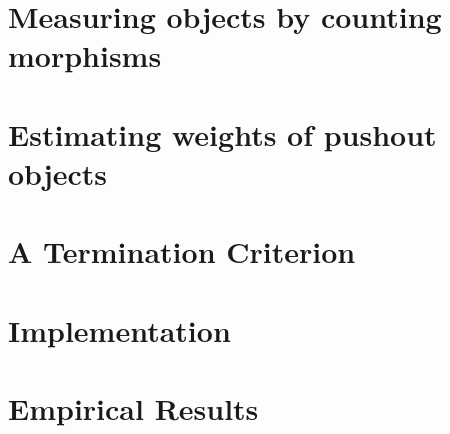 \documentclass{book}
\begin{document}
\section{Measuring objects by counting morphisms}
\label{sec:type_graph:measuring_graphs}

% 

%  
  
\section{Estimating weights of pushout objects} 
\label{sec:type_graph:weighing_pushout} 
  

\section{A Termination Criterion}
\label{sec:type_graph:termination}
   
  
% 

\section{Implementation}
\label{sec:type_graph:implementation}
 


%  

\section{Empirical Results}
\label{sec:type_graph:result}
 
\end{document}

